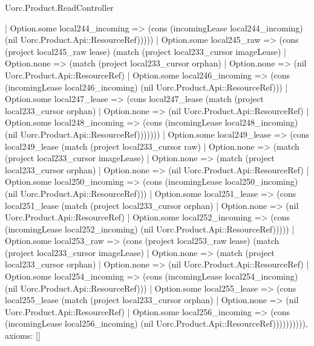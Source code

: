 \begin{lexlean}{Uorc.Product.ReadController}
\begin{semanticmodule}
{            | Option.some local244_incoming => (cons (incomingLease local244_incoming) (nil Uorc.Product.Api::ResourceRef)))))
        | Option.some local245_raw => (cons (project local245_raw lease) (match (project local233_cursor imageLease)
          | Option.none => (match (project local233_cursor orphan)
            | Option.none => (nil Uorc.Product.Api::ResourceRef)
            | Option.some local246_incoming => (cons (incomingLease local246_incoming) (nil Uorc.Product.Api::ResourceRef)))
          | Option.some local247_lease => (cons local247_lease (match (project local233_cursor orphan)
            | Option.none => (nil Uorc.Product.Api::ResourceRef)
            | Option.some local248_incoming => (cons (incomingLease local248_incoming) (nil Uorc.Product.Api::ResourceRef)))))))
      | Option.some local249_lease => (cons local249_lease (match (project local233_cursor raw)
        | Option.none => (match (project local233_cursor imageLease)
          | Option.none => (match (project local233_cursor orphan)
            | Option.none => (nil Uorc.Product.Api::ResourceRef)
            | Option.some local250_incoming => (cons (incomingLease local250_incoming) (nil Uorc.Product.Api::ResourceRef)))
          | Option.some local251_lease => (cons local251_lease (match (project local233_cursor orphan)
            | Option.none => (nil Uorc.Product.Api::ResourceRef)
            | Option.some local252_incoming => (cons (incomingLease local252_incoming) (nil Uorc.Product.Api::ResourceRef)))))
        | Option.some local253_raw => (cons (project local253_raw lease) (match (project local233_cursor imageLease)
          | Option.none => (match (project local233_cursor orphan)
            | Option.none => (nil Uorc.Product.Api::ResourceRef)
            | Option.some local254_incoming => (cons (incomingLease local254_incoming) (nil Uorc.Product.Api::ResourceRef)))
          | Option.some local255_lease => (cons local255_lease (match (project local233_cursor orphan)
            | Option.none => (nil Uorc.Product.Api::ResourceRef)
            | Option.some local256_incoming => (cons (incomingLease local256_incoming) (nil Uorc.Product.Api::ResourceRef)))))))))),
  axioms: []
}


\end{semanticmodule}
\end{lexlean}
